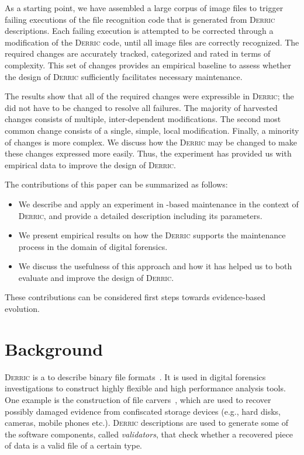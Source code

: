\documentclass[a4paper]{llncs}
\def\derric{\textsc{Derric}\xspace}
\newcommand{\DSL}{\textsmaller{DSL}\xspace}
\begin{document}
As a starting point, we have assembled a large corpus of image files to trigger failing executions of the file recognition code that is generated from \derric descriptions.
Each failing execution is attempted to be corrected through a modification of the \derric code, until all image files are correctly recognized.
The required changes are accurately tracked, categorized and rated in terms of complexity.
This set of changes provides an empirical baseline to assess whether the design of \derric sufficiently facilitates necessary maintenance.

The results show that all of the required changes were expressible in \derric; the \DSL did not have to be changed to resolve all failures.
The majority of harvested changes consists of multiple, inter-dependent modifications. 
The second most common change consists of a single, simple, local modification.
Finally, a minority of changes is more complex.
We discuss how the \derric \DSL may be changed to make these changes expressed more easily.
Thus, the experiment has provided us with empirical data to improve the design of \derric.

The contributions of this paper can be summarized as follows:
\begin{itemize}
\item We describe and apply an experiment in \DSL-based maintenance in the context of \derric, and provide a detailed description including its parameters.
\item We present empirical results on how the \derric \DSL supports the maintenance process in the domain of digital forensics.
\item We discuss the usefulness of this approach and how it has helped us to both evaluate and improve the design of \derric.
\end{itemize}
These contributions can be considered first steps towards evidence-based \DSL evolution. 

\section{Background\label{sect:background}}

\noindent
\derric is a \DSL to describe binary file formats~\cite{derric_casestudy}. 
It is used in digital forensics investigations to construct highly flexible and high performance analysis tools. 
One example is the construction of file carvers~\cite{derric_background}, which are used to recover possibly damaged evidence from confiscated storage devices (e.g., hard disks, cameras, mobile phones etc.). 
\derric descriptions are used to generate some of the software components, called \textit{validators}, that check whether a recovered piece of data is a valid file of a certain type.
\end{document}
